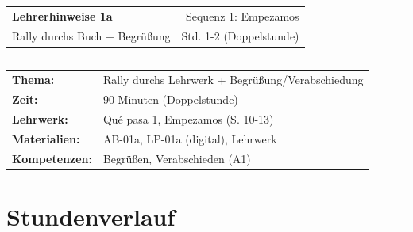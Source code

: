 \documentclass[11pt,a4paper]{article}
\begin{document}
\noindent
\begin{tabularx}{\textwidth}{@{}Xr@{}}
    {\Large\textbf{\textcolor{spanisch}{Lehrerhinweise 1a}}} & Sequenz 1: Empezamos \\[0.3em]
    {\small Rally durchs Buch + Begrüßung} & Std. 1-2 (Doppelstunde) \\
\end{tabularx}

\vspace{0.5em}
\hrule
\vspace{1em}

\begin{infobox}[Kurzübersicht]
\begin{tabularx}{\textwidth}{@{}lX@{}}
\textbf{Thema:} & Rally durchs Lehrwerk + Begrüßung/Verabschiedung \\
\textbf{Zeit:} & 90 Minuten (Doppelstunde) \\
\textbf{Lehrwerk:} & Qué pasa 1, Empezamos (S. 10-13) \\
\textbf{Materialien:} & AB-01a, LP-01a (digital), Lehrwerk \\
\textbf{Kompetenzen:} & Begrüßen, Verabschieden (A1) \\
\end{tabularx}
\end{infobox}

\vspace{1em}

\section*{Stundenverlauf}
\end{document}

